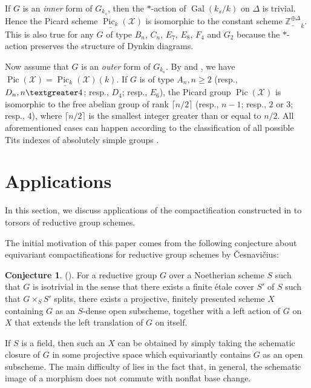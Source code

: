 \documentclass[11pt, reqno]{amsart}
\theoremstyle{plain}
\theoremstyle{definition}
\newtheorem{conjecture}[theorem]{Conjecture}
\DeclareMathOperator{\Gal}{Gal}
\DeclareMathOperator{\Pic}{Pic}    %
\begin{document}
If $G$ is an \emph{inner} form of $G_{k_s}$, then the $\ast$-action of $\Gal(k_s/k)$ on $\Delta$ is trivial. Hence the Picard scheme $\underline{\Pic_k}(\mathcal{X})$ is isomorphic to the constant scheme $\underline{\mathbb{Z}^{\oplus \Delta}}_{k}$. This is also true for any $G$ of type $B_n$, $C_n$, $E_7$, $E_8$, $F_4$ and $G_2$ because the $\ast$-action preserves the structure of Dynkin diagrams. 

Now assume that $G$ is an \emph{outer} form of $G_{k_s}$. By \cite[corollaire~7.8.8]{EGA3II} and \cite[\S~8.1, Proposition~4]{BLR}, we have $\Pic(\mathcal{X})=\underline{\Pic_k}(\mathcal{X})(k)$. If $G$ is of type $A_n, n\geq 2$ (resp., $D_n, n\textgreater 4$; resp., $D_4$; resp., $E_6$), the Picard group $\Pic(\mathcal{X})$ is isomorphic to the free abelian group of rank $\lceil n/2 \rceil$ (resp., $n-1$; resp., $2$ or $3$; resp., $4$), where $\lceil n/2 \rceil$ is the smallest integer greater than or equal to $n/2$. All aforementioned cases can happen according to the classification of all possible Tits indexes of absolutely simple groups \cite[Table~II]{Titsclassificationsemisimplegroups}.
  







\section{Applications}\label{sectionapplications}
In this section, we discuss applications of the compactification constructed in  to torsors of reductive group schemes. 

The initial motivation of this paper comes from the following conjecture about equivariant compactifications for reductive group schemes by \v{C}esnavi\v{c}ius:

\begin{conjecture}\label{conjecture}
(\cite[Conjecture~6.2.3]{CKproblemtorsors}). For a reductive group $G$ over a Noetherian scheme $S$ such that $G$ is isotrivial in the sense that there exists a finite étale cover $S'$ of $S$ such that $G\times_{S}S'$ splits, there exists a projective, finitely presented scheme $X$ containing $G$ as an $S$-dense open subscheme, together with a left action of $G$ on $X$ that extends the left translation of $G$ on itself.
\end{conjecture}

If $S$ is a field, then such an $X$ can be obtained by simply taking the schematic closure of $G$ in some projective space which equivariantly contains $G$ as an open subscheme. The main difficulty of  lies in the fact that, in general, the schematic image of a morphism does not commute with nonflat base change.
\end{document}
